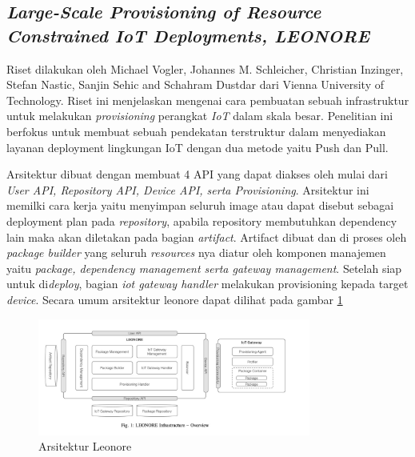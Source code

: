 \subsection{\textit{Large-Scale Provisioning of
    Resource Constrained
    IoT Deployments, LEONORE}}
Riset dilakukan oleh Michael Vogler, Johannes M. Schleicher, Christian Inzinger, Stefan Nastic, Sanjin Sehic and Schahram Dustdar dari Vienna University of Technology. Riset ini menjelaskan mengenai cara pembuatan sebuah infrastruktur untuk melakukan \textit{provisioning} perangkat \textit{IoT} dalam skala besar. Penelitian ini berfokus untuk membuat sebuah pendekatan terstruktur dalam menyediakan layanan deployment lingkungan IoT dengan dua metode yaitu Push dan Pull.

Arsitektur dibuat dengan membuat 4 API yang dapat diakses oleh mulai dari  \textit{User API, Repository API, Device API, serta Provisioning}. Arsitektur ini memilki cara kerja yaitu menyimpan seluruh image atau dapat disebut sebagai deployment plan pada \textit{repository}, apabila repository membutuhkan dependency lain maka akan diletakan pada bagian \textit{artifact}. Artifact dibuat dan di proses oleh \textit{package builder} yang seluruh \textit{resources} nya diatur oleh komponen manajemen yaitu \textit{package, dependency management serta gateway management}. Setelah siap untuk di\textit{deploy}, bagian \textit{iot gateway handler} melakukan provisioning kepada target \textit{device}. Secara umum arsitektur leonore dapat dilihat pada gambar \ref{fig:arsitektur-leonore}

\begin{figure}[ht]
  \centering
  \includegraphics[width=0.8\textwidth]{resources/chapter-2/arsitektur-leonore.jpg}
  \caption{Arsitektur Leonore}
  \label{fig:arsitektur-leonore}
\end{figure}
